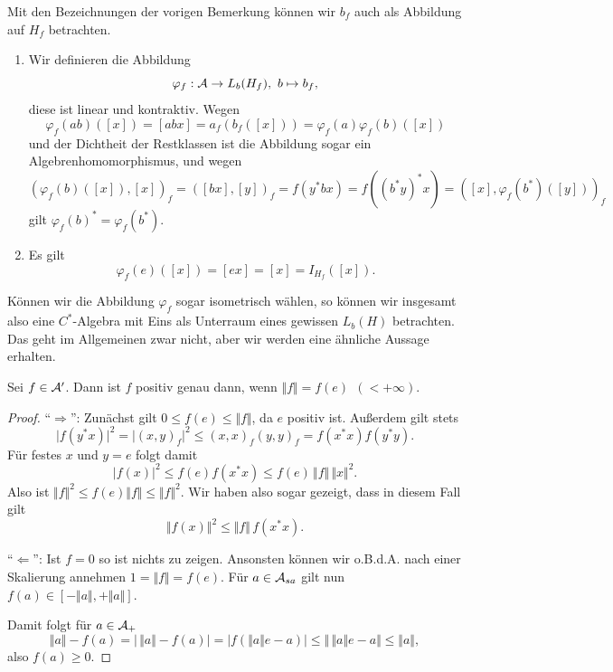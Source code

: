 \begin{remark}
    Mit den Bezeichnungen der vorigen Bemerkung können wir $b_f$ auch als Abbildung auf $H_f$ betrachten.

    \begin{enumerate}
        \item Wir definieren die Abbildung
        $$ \varphi_f : \mathcal{A} \to L_b(H_f), \ b \mapsto b_f, $$
        diese ist linear und kontraktiv. Wegen
        $$ \varphi_f(ab)([x]) = [abx] = a_f(b_f([x])) = \varphi_f(a) \varphi_f(b) ([x]) $$
        und der Dichtheit der Restklassen ist die Abbildung sogar ein Algebrenhomomorphismus, und wegen
        $$ (\varphi_f(b)([x]), [x])_f = ([bx], [y])_f = f(y^* b x) = f((b^*y)^* x) = ([x], \varphi_f(b^*) ([y]))_f $$
        gilt $\varphi_f(b)^* = \varphi_f(b^*)$.

        \item Es gilt
        $$ \varphi_f(e)([x]) = [ex] = [x] = I_{H_f}([x]). $$
    \end{enumerate}
\end{remark}

Können wir die Abbildung $\varphi_f$ sogar isometrisch wählen, so können wir insgesamt also eine $C^*$-Algebra mit Eins als Unterraum eines gewissen $L_b(H)$ betrachten. Das geht im Allgemeinen zwar nicht, aber wir werden eine ähnliche Aussage erhalten.

\begin{proposition}
    Sei $f \in \mathcal{A}'$. Dann ist $f$ positiv genau dann, wenn $\Vert f \Vert = f(e) \ \ (< +\infty)$.
\end{proposition}

\begin{proof}
    ``$\Longrightarrow$'': Zunächst gilt $0 \leq f(e) \leq \Vert f \Vert$, da $e$ positiv ist. Außerdem gilt stets
    $$ \vert f(y^* x) \vert^2 = \vert (x, y)_f \vert^2 \leq (x, x)_f (y, y)_f = f(x^* x) f(y^* y). $$
    Für festes $x$ und $y=e$ folgt damit
    $$ \vert f(x) \vert^2 \leq f(e) f(x^* x) \leq f(e) \, \Vert f \Vert \, \Vert x \Vert^2. $$
    Also ist $\Vert f \Vert^2 \leq f(e) \Vert f \Vert \leq \Vert f \Vert^2$. Wir haben also sogar gezeigt, dass in diesem Fall gilt
    $$ \Vert f(x) \Vert^2 \leq \Vert f \Vert \, f(x^* x). $$

    ``$\Longleftarrow$'': Ist $f=0$ so ist nichts zu zeigen. Ansonsten können wir o.B.d.A. nach einer Skalierung annehmen $ 1 = \Vert f \Vert = f(e) $. Für $a \in \mathcal{A}_{sa}$ gilt nun $f(a) \in [-\Vert a \Vert, +\Vert a \Vert]$.

    Damit folgt für $a \in \mathcal{A}_+$
    $$ \Vert a \Vert - f(a) = \vert \, \Vert a \Vert - f(a) \vert = \vert f(\Vert a \Vert e - a) \vert \leq \Vert \, \Vert a \Vert e - a \Vert \leq \Vert a \Vert, $$
    also $f(a) \geq 0$.
\end{proof}

